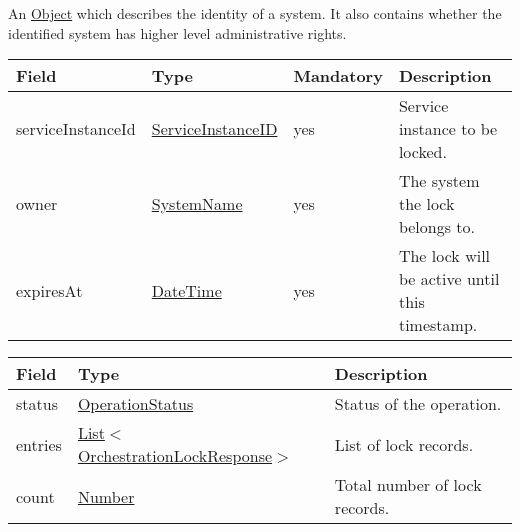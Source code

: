 \documentclass[a4paper]{arrowhead}
\newcommand{\pref}[1]{{\textcolor{ArrowheadGrey}{\hyperref[sec:model:primitives:#1]{#1}}}}
\begin{document}

An \pref{Object} which describes the identity of a system. It also contains whether the identified system has higher level administrative rights.


\begin{table}[ht!]
\begin{tabularx}{\textwidth}{| p{3.2cm} | p{3.5cm} | p{2cm} | X |} \hline
\rowcolor{gray!33} Field & Type & Mandatory & Description \\ \hline
serviceInstanceId & \pref{ServiceInstanceID} & yes & Service instance to be locked. \\ \hline
owner & \pref{SystemName} & yes & The system the lock belongs to. \\ \hline
expiresAt & \pref{DateTime} & yes & The lock will be active until this timestamp. \\ \hline
\end{tabularx}
\end{table}

 
\begin{table}[ht!]
\begin{tabularx}{\textwidth}{| p{3cm} | p{6.8cm} | X |} \hline
\rowcolor{gray!33} Field & Type & Description \\ \hline
status & \pref{OperationStatus} & Status of the operation. \\ \hline
entries & \pref{List}$<$\hyperref[sec:model:OrchestrationLockResponse]{OrchestrationLockResponse}$>$ & List of lock records. \\ \hline
count & \pref{Number} & Total number of lock records. \\ \hline
\end{tabularx}
\end{table}

\clearpage

\end{document}
